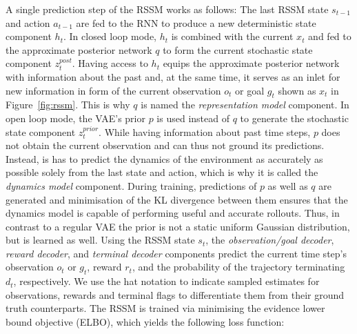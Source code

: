 \documentclass{article}
\begin{document}
A single prediction step of the RSSM works as follows:
The last RSSM state $s_{t-1}$ and action $a_{t-1}$ are fed to the RNN to produce a new deterministic state component $h_t$.
In closed loop mode, $h_t$ is combined with the current $x_t$ and fed to the approximate posterior network $q$ to form the current stochastic state component $z_t^{post}$. Having access to $h_t$ equips the approximate posterior network with information about the past and, at the same time, it serves as an inlet for new information in form of the current observation $o_t$ or goal $g_t$ shown as $x_t$ in Figure~\ref{fig:rssm}. This is why $q$ is named the \textit{representation model} component.
In open loop mode, the VAE's prior $p$ is used instead of $q$ to generate the stochastic state component $z_t^{prior}$. While having information about past time steps, $p$ does not obtain the current observation and can thus not ground its predictions. Instead, is has to predict the dynamics of the environment as accurately as possible solely from the last state and action, which is why it is called the \textit{dynamics model} component.
During training, predictions of $p$ as well as $q$ are generated and minimisation of the KL divergence between them ensures that the dynamics model is capable of performing useful and accurate rollouts. Thus, in contrast to a regular VAE the prior is not a static uniform Gaussian distribution, but is learned as well.
Using the RSSM state $s_t$, the \textit{observation/goal decoder}, \textit{reward decoder}, and \textit{terminal decoder} components predict the current time step's observation $o_t$ or $g_t$, reward $r_t$, and the probability of the trajectory terminating $d_t$, respectively.
We use the hat notation to indicate sampled estimates for observations, rewards and terminal flags to differentiate them from their ground truth counterparts. The RSSM is trained via minimising the evidence lower bound objective (ELBO), which yields the following loss function:
\end{document}
